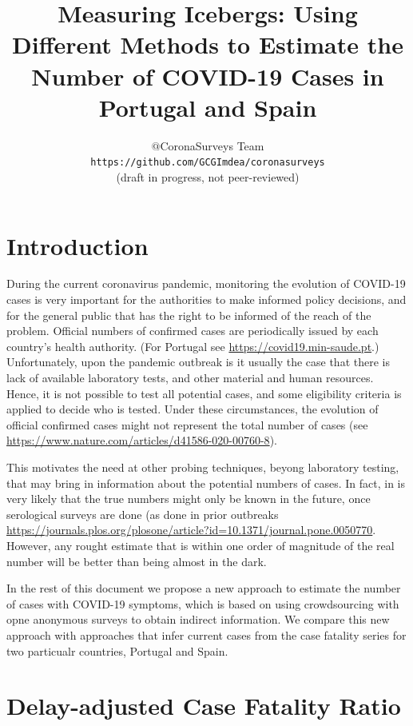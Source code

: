 \documentclass{article}
\begin{document}
\title{Measuring Icebergs: Using Different Methods to Estimate the Number of COVID-19 Cases in Portugal and Spain}
\author{$@$CoronaSurveys Team \\ \texttt{https://github.com/GCGImdea/coronasurveys}\\(draft in progress, not peer-reviewed)}
\maketitle
\section{Introduction}

During the current coronavirus pandemic, monitoring the evolution of COVID-19 cases is very important for the authorities to make
informed policy decisions, and for the general public that has the right to be informed of the reach of the problem. 
Official numbers of confirmed cases are periodically issued by each country's health authority. (For Portugal see \url{https://covid19.min-saude.pt}.)
Unfortunately, upon the pandemic outbreak is it usually the case that there is lack of available laboratory tests, and other material and human resources. Hence, it is not possible to test all potential cases, and some eligibility criteria is applied to decide who is tested.
Under these circumstances, the evolution of official confirmed cases might not represent the total number of cases (see \url{https://www.nature.com/articles/d41586-020-00760-8}).  

This motivates the need at other probing techniques, beyong laboratory testing, that may bring in information about the potential numbers of cases. In fact, in is very likely that the true numbers might only be known in the future, once serological surveys are done (as done in prior outbreaks \url{https://journals.plos.org/plosone/article?id=10.1371/journal.pone.0050770}. However, any rought estimate that is within one order of magnitude of the real number will be better than being almost in the dark.

In the rest of this document we propose a new approach to estimate the number of cases with COVID-19 symptoms, which is based on using crowdsourcing with opne anonymous surveys to obtain indirect information. We compare this new approach with approaches that infer current cases from the case fatality series for two particualr countries, Portugal and Spain.

\section{Delay-adjusted Case Fatality Ratio}
\end{document}
